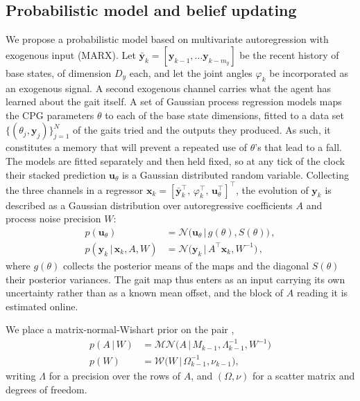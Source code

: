 \documentclass[lettersize,journal]{IEEEtran}
\newcommand{\cN}{\mathcal{N}}
\newcommand{\given}[1][]{\,#1\vert\,}
\begin{document}
\subsection{Probabilistic model and belief updating}
We propose a probabilistic model based on multivariate autoregression with exogenous input (MARX). Let $\bar{\mathbf{y}}_k = [\mathbf{y}_{k-1}, \dots \mathbf{y}_{k-m_y}]$ be the recent history of base states, of dimension $D_y$ each, and let the joint angles $\varphi_k$ be incorporated as an exogenous signal.
A second exogenous channel carries what the agent has learned about the gait itself. A set of Gaussian process regression models maps the CPG parameters $\theta$ to each of the base state dimensions, fitted to a data set $\{(\theta_j, \mathbf{y}_j)\}_{j=1}^N$ of the gaits tried and the outputs they produced. As such, it constitutes a memory that will prevent a repeated use of $\theta$'s that lead to a fall. The models are fitted separately and then held fixed, so at any tick of the clock their stacked prediction $\mathbf{u}_{\theta}$ is a Gaussian distributed random variable. Collecting the three channels in a regressor $\mathbf{x}_k = [\bar{\mathbf{y}}_k^\top,\, \varphi_k^\top,\, \mathbf{u}_{\theta}^\top]^\top$, the evolution of $\mathbf{y}_k$ is described as a Gaussian distribution over autoregressive coefficients $A$ and process noise precision $W$:
\begin{align}
    p(\mathbf{u}_{\theta}) &= \cN\big(\mathbf{u}_{\theta} \given g(\theta), S(\theta)\big) \, , \label{eq:gp-input} \\
    p(\mathbf{y}_k \given \mathbf{x}_k, A, W) &= \cN\big(\mathbf{y}_k \given A^\top \mathbf{x}_k, W^{-1}\big) \, , \label{eq:marx}
\end{align}
where $g(\theta)$ collects the posterior means of the maps and the diagonal $S(\theta)$ their posterior variances.
The gait map thus enters as an input carrying its own uncertainty rather than as a known mean offset, and the block of $A$ reading it is estimated online.

We place a matrix-normal-Wishart prior on the pair \cite{nisslbeck2025factor},
\begin{align} \label{eq:mnw-prior}
    p(A \given W)  &=  \mathcal{MN}\big(A \given M_{k-1}, \Lambda_{k-1}^{-1}, W^{-1}\big) \\
   p(W) &= \mathcal{W}\big(W \given \Omega_{k-1}^{-1}, \nu_{k-1}\big) ,
\end{align}
writing $\Lambda$ for a precision over the rows of $A$, and $(\Omega, \nu)$ for a scatter matrix and degrees of freedom.
\end{document}
